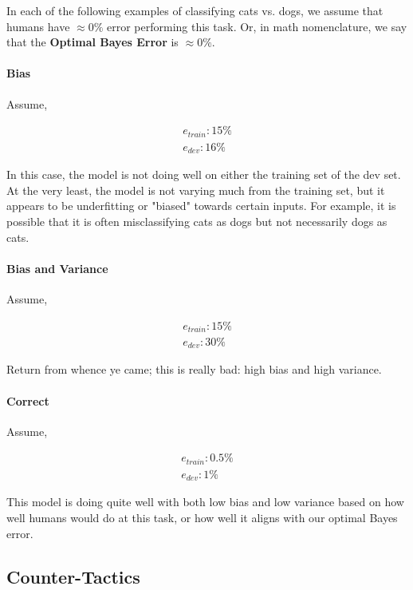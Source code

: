 \documentclass{article}
\begin{document}
In each of the following examples of classifying cats vs. dogs, we assume that humans have $\approx 0\%$ error performing this task.  Or, in math nomenclature, we say that the \textbf{Optimal Bayes Error} is $\approx 0\%$.

\paragraph{Bias}

Assume,

\begin{gather}
e_{train}: 15\% \\
e_{dev}: 16\%
\end{gather}

In this case, the model is not doing well on either the training set of the dev set.  At the very least, the model is not varying much from the training set, but it appears to be underfitting or "biased" towards certain inputs.  For example, it is possible that it is often misclassifying cats as dogs but not necessarily dogs as cats.

\paragraph{Bias and Variance}

Assume,

\begin{gather}
e_{train}: 15\% \\
e_{dev}: 30\%
\end{gather}

Return from whence ye came; this is really bad: high bias and high variance.

\paragraph{Correct}

Assume,

\begin{gather}
e_{train}: 0.5\% \\
e_{dev}: 1\%
\end{gather}

This model is doing quite well with both low bias and low variance based on how well humans would do at this task, or how well it aligns with our optimal Bayes error.

\subsection{Counter-Tactics}
\end{document}
